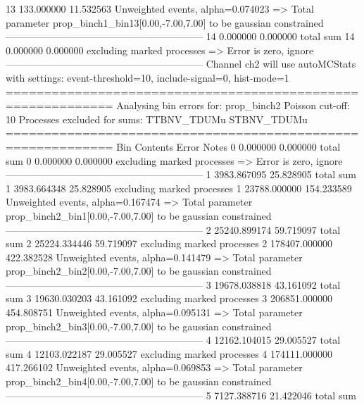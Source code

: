 13         133.000000      11.532563       Unweighted events, alpha=0.074023
  => Total parameter prop_binch1_bin13[0.00,-7.00,7.00] to be gaussian constrained
------------------------------------------------------------
14         0.000000        0.000000        total sum                     
14         0.000000        0.000000        excluding marked processes    
  => Error is zero, ignore      
------------------------------------------------------------
Channel ch2 will use autoMCStats with settings: event-threshold=10, include-signal=0, hist-mode=1
============================================================
Analysing bin errors for: prop_binch2
Poisson cut-off: 10
Processes excluded for sums: TTBNV_TDUMu STBNV_TDUMu
============================================================
Bin        Contents        Error           Notes                         
0          0.000000        0.000000        total sum                     
0          0.000000        0.000000        excluding marked processes    
  => Error is zero, ignore      
------------------------------------------------------------
1          3983.867095     25.828905       total sum                     
1          3983.664348     25.828905       excluding marked processes    
1          23788.000000    154.233589      Unweighted events, alpha=0.167474
  => Total parameter prop_binch2_bin1[0.00,-7.00,7.00] to be gaussian constrained
------------------------------------------------------------
2          25240.899174    59.719097       total sum                     
2          25224.334446    59.719097       excluding marked processes    
2          178407.000000   422.382528      Unweighted events, alpha=0.141479
  => Total parameter prop_binch2_bin2[0.00,-7.00,7.00] to be gaussian constrained
------------------------------------------------------------
3          19678.038818    43.161092       total sum                     
3          19630.030203    43.161092       excluding marked processes    
3          206851.000000   454.808751      Unweighted events, alpha=0.095131
  => Total parameter prop_binch2_bin3[0.00,-7.00,7.00] to be gaussian constrained
------------------------------------------------------------
4          12162.104015    29.005527       total sum                     
4          12103.022187    29.005527       excluding marked processes    
4          174111.000000   417.266102      Unweighted events, alpha=0.069853
  => Total parameter prop_binch2_bin4[0.00,-7.00,7.00] to be gaussian constrained
------------------------------------------------------------
5          7127.388716     21.422046       total sum                     
